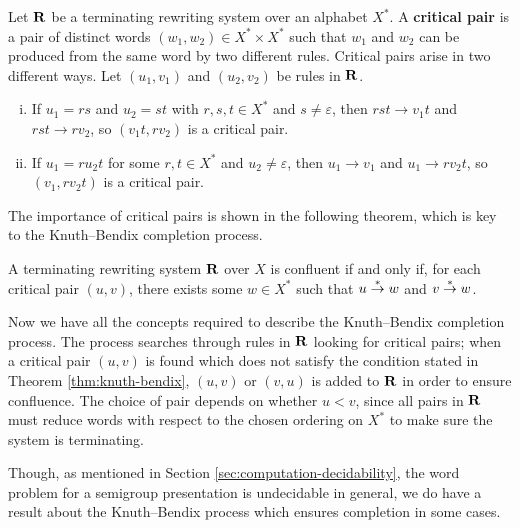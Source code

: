 \begin{definition}
  \label{def:critical-pair}
  Let $\mathbf{R}$ be a terminating rewriting system over an alphabet $X^*$.  A
  \textbf{critical pair} is a pair of distinct words
  $(w_1, w_2) \in X^* \times X^*$ such that $w_1$ and $w_2$ can be produced from
  the same word by two different rules.
  Critical pairs arise in two different ways.
  Let $(u_1, v_1)$ and $(u_2, v_2)$ be rules in $\mathbf{R}$.
  \begin{enumerate}[(i)]
  \item If $u_1 = rs$ and $u_2 = st$ with $r,s,t \in X^*$ and
    $s \neq \varepsilon$, then $rst \to v_1t$ and $rst \to rv_2$, so
    $(v_1t, rv_2)$ is a critical pair.
  \item If $u_1 = ru_2t$ for some $r,t \in X^*$ and $u_2 \neq \varepsilon$, then
    $u_1 \to v_1$ and $u_1 \to rv_2t$, so $(v_1, rv_2t)$ is a critical
    pair.
  \end{enumerate}
\end{definition}

The importance of critical pairs is shown in the following theorem, which is key
to the Knuth--Bendix completion process.

\begin{theorem}
  \label{thm:knuth-bendix}
  A terminating rewriting system $\mathbf{R}$ over $X$ is confluent if and only if,
  for each critical pair $(u, v)$, there exists some $w \in X^*$ such that
  $u \stackrel{*}{\to} w$ and $v \stackrel{*}{\to} w$.
\end{theorem}

Now we have all the concepts required to describe the Knuth--Bendix completion
process.  The process searches through rules in $\mathbf{R}$ looking for critical
pairs; when a critical pair $(u, v)$ is found which does not satisfy the
condition stated in Theorem \ref{thm:knuth-bendix}, $(u, v)$ or $(v, u)$ is
added to $\mathbf{R}$ in order to ensure confluence.  The choice of pair depends on
whether $u < v$, since all pairs in $\mathbf{R}$ must reduce words with respect to the
chosen ordering on $X^*$ to make sure the system is terminating.

Though, as mentioned in Section \ref{sec:computation-decidability}, the word problem for a
semigroup presentation is undecidable in general, we do have a result about the
Knuth--Bendix process which ensures completion in some cases.

